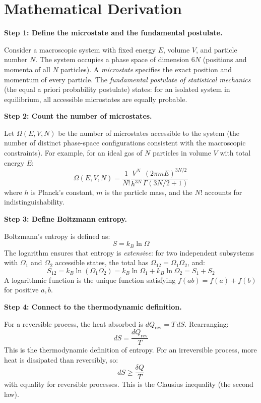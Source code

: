 \section*{Mathematical Derivation}

\textbf{Step 1: Define the microstate and the fundamental postulate.}

Consider a macroscopic system with fixed energy $E$, volume $V$, and particle number $N$. The system occupies a phase space of dimension $6N$ (positions and momenta of all $N$ particles). A \emph{microstate} specifies the exact position and momentum of every particle. The \emph{fundamental postulate of statistical mechanics} (the equal a priori probability postulate) states: for an isolated system in equilibrium, all accessible microstates are equally probable.

\textbf{Step 2: Count the number of microstates.}

Let $\Omega(E, V, N)$ be the number of microstates accessible to the system (the number of distinct phase-space configurations consistent with the macroscopic constraints). For example, for an ideal gas of $N$ particles in volume $V$ with total energy $E$:
\begin{equation}
\Omega(E, V, N) = \frac{1}{N!}\frac{V^N}{h^{3N}}\frac{(2\pi m E)^{3N/2}}{\Gamma(3N/2 + 1)}
\end{equation}
where $h$ is Planck's constant, $m$ is the particle mass, and the $N!$ accounts for indistinguishability.

\textbf{Step 3: Define Boltzmann entropy.}

Boltzmann's entropy is defined as:
\begin{equation}
S = k_B \ln \Omega
\end{equation}
The logarithm ensures that entropy is \emph{extensive}: for two independent subsystems with $\Omega_1$ and $\Omega_2$ accessible states, the total has $\Omega_{12} = \Omega_1 \Omega_2$, and:
\begin{equation}
S_{12} = k_B \ln(\Omega_1\Omega_2) = k_B\ln\Omega_1 + k_B\ln\Omega_2 = S_1 + S_2
\end{equation}
A logarithmic function is the unique function satisfying $f(ab) = f(a) + f(b)$ for positive $a, b$.

\textbf{Step 4: Connect to the thermodynamic definition.}

For a reversible process, the heat absorbed is $dQ_{\text{rev}} = T\,dS$. Rearranging:
\begin{equation}
dS = \frac{dQ_{\text{rev}}}{T}
\end{equation}
This is the thermodynamic definition of entropy. For an irreversible process, more heat is dissipated than reversibly, so:
\begin{equation}
dS \geq \frac{\delta Q}{T}
\end{equation}
with equality for reversible processes. This is the Clausius inequality (the second law).

